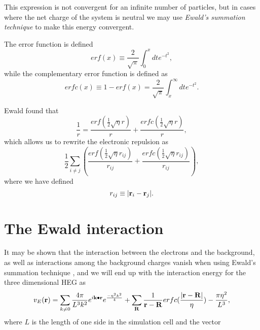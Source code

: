 This expression is not convergent for an infinite number of particles, but in cases where the net charge of the system is neutral we may use \emph{Ewald's summation technique} to make this energy convergent.

The error function is defined \cite{rottmann}
\begin{equation}
erf(x) \equiv \frac{2}{\sqrt{\pi}} \int_{0}^x dt e^{-t^2},
\end{equation}
while the complementary error function is defined \cite{rottmann} as
\begin{equation}
erfc(x) \equiv 1 - erf(x) = \frac{2}{\sqrt{\pi}} \int_{x}^\infty dt e^{-t^2} .
\end{equation}

Ewald \cite{Ewald1921} found that 
\begin{equation}
\frac{1}{r} = \frac{erf( \frac{1}{2} \sqrt{\eta} r) }{r} + \frac{ erfc(\frac{1}{2} \sqrt{\eta} r) }{r},
\end{equation}
which allows us to rewrite the electronic repulsion as
\begin{equation}
 \frac{1}{2} \sum_{i \neq j} ( \frac{erf( \frac{1}{2} \sqrt{\eta} r_{ij}) }{r_{ij}} + \frac{ erfc(\frac{1}{2} \sqrt{\eta} r_{ij}) }{r_{ij}}),
\label{eqn:ewaldsum}
\end{equation}
where we have  defined
\begin{equation}
r_{ij} \equiv \vert \bold{r}_i - \bold{r}_j \vert .
\end{equation}

\section{The Ewald interaction}

It may be shown that the interaction between the electrons and the
background, as well as interactions among the background charges
vanish when using Ewald's summation technique \cite{Fraser1996}, and
we will end up with the interaction energy for the three dimensional
HEG \cite{Drummond2008} as
\begin{equation}
v_{E}(\bold{r}) = \sum_{k \neq 0} \frac{4 \pi}{L^3 k^2 } e^{i \bold{k} \bullet \bold{r}}  e^{\frac{-\eta^2 k^2}{4} } + \sum_\bold{R} \frac{1}{\bold{r}- \bold{R}} erfc(\frac{\vert \bold{r}- \bold{R} \vert }{\eta}) - \frac{\pi \eta^2}{L^3 } ,
\label{eqn:HEG_interaction}
\end{equation}
where $L$ is the length of one side in the simulation cell and the vector

